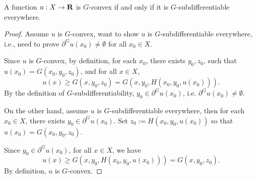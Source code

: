 \begin{lemma}\label{convex-subdiff0}
A function $u: X \rightarrow {\mathbf R}$ is $G$-convex if and only if it is $G$-subdifferentiable everywhere.
\end{lemma}
\begin{proof}[Proof]
		Assume $u$ is $G$-convex, want to show $u$ is $G$-subdifferentiable everywhere, i.e., need to prove  $\partial^G u(x_0)\neq \emptyset$ for all $x_0\in X$.
		
		Since $u$ is $G$-convex, by definition, for each $x_0$, there exists $ y_0, z_0$, such that $u(x_0) = G(x_0,y_0,z_0)$, and for all  $ x \in X$, 
		\begin{equation*}
		u(x)\ge G(x, y_0, z_0) = G(x, y_0, H(x_0,y_0,u(x_0))).
		\end{equation*}
		By the definition of $G$-subdifferentiability, $y_0 \in \partial^G u(x_0)$, i.e. $\partial^G u(x_0) \neq \emptyset$.
		
		On the other hand, assume $u$ is $G$-subdifferentiable everywhere, then for each $ x_0 \in X$,  there exists $ y_0 \in \partial^G u(x_0)$. Set $z_0:=H(x_0,y_0,u(x_0))$ so that $u(x_0) = G(x_0, y_0, z_0)$.
		
		Since $y_0\in \partial^G u(x_0)$, for all $x\in X$, we have 
		\begin{equation*}
		u(x)\ge G(x,y_0,H(x_0,y_0,u(x_0))) = G(x,y_0,z_0).
		\end{equation*}
		By definition, $u$ is $G$-convex.
\end{proof}
%	
%	
%	
%	
%	
				
